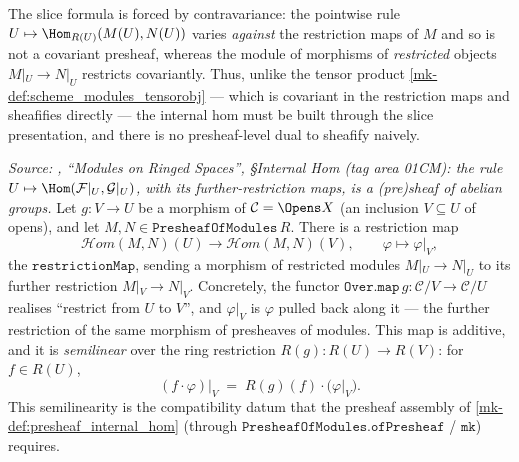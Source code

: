 \begin{definition}
  The slice formula is forced by contravariance: the pointwise rule
  \(U \mapsto \Hom_{R(U)}(M(U), N(U))\) varies \emph{against} the restriction maps of
  \(M\) and so is not a covariant presheaf, whereas the module of morphisms of
  \emph{restricted} objects \(M|_U \to N|_U\) restricts covariantly. Thus, unlike the
  tensor product \ref{mk-def:scheme_modules_tensorobj} --- which is covariant in the
  restriction maps and sheafifies directly --- the internal hom must be built through
  the slice presentation, and there is no presheaf-level dual to sheafify naively.
\end{definition}

\begin{lemma}\label{mk-lem:presheaf_internal_hom_restriction}
  \leanok

  \textit{Source: \cite{stacks-project}, ``Modules on Ringed Spaces'', \S Internal Hom
  (tag area 01CM): the rule \(U \mapsto \Hom(\mathcal{F}|_U, \mathcal{G}|_U)\), with its
  further-restriction maps, is a (pre)sheaf of abelian groups.}
  Let \(g : V \to U\) be a morphism of \(\mathcal{C} = \Opens X\) (an inclusion
  \(V \subseteq U\) of opens), and let \(M, N \in \mathtt{PresheafOfModules}\,R\). There
  is a restriction map
  \[
    \mathcal{H}om(M, N)(U) \longrightarrow \mathcal{H}om(M, N)(V),
    \qquad \varphi \longmapsto \varphi|_V,
  \]
  the \(\mathtt{restrictionMap}\), sending a morphism of restricted modules
  \(M|_U \to N|_U\) to its further restriction \(M|_V \to N|_V\). Concretely, the
  functor \(\mathtt{Over.map}\,g : \mathcal{C}/V \to \mathcal{C}/U\) realises
  ``restrict from \(U\) to \(V\)'', and \(\varphi|_V\) is \(\varphi\) pulled back along
  it --- the further restriction of the same morphism of presheaves of modules. This
  map is additive, and it is \emph{semilinear} over the ring restriction
  \(R(g) : R(U) \to R(V)\): for \(f \in R(U)\),
  \[
    (f \cdot \varphi)\big|_V \;=\; R(g)(f) \cdot \bigl(\varphi|_V\bigr).
  \]
  This semilinearity is the compatibility datum that the presheaf assembly of
  \ref{mk-def:presheaf_internal_hom} (through \(\mathtt{PresheafOfModules.ofPresheaf}\) /
  \(\mathtt{mk}\)) requires.
\end{lemma}

